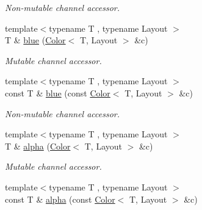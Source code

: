\begin{DoxyCompactItemize}
\begin{DoxyCompactList}\small\item\em Non-\/mutable channel accessor. \end{DoxyCompactList}\item 
\hypertarget{group___channel_accessors_ga002fae45c069050f774c897a69e18b39}{{\footnotesize template$<$typename T , typename Layout $>$ }\\T \& \hyperlink{group___channel_accessors_ga002fae45c069050f774c897a69e18b39}{blue} (\hyperlink{class_d_o_1_1_color}{Color}$<$ T, Layout $>$ \&c)}\label{group___channel_accessors_ga002fae45c069050f774c897a69e18b39}

\begin{DoxyCompactList}\small\item\em Mutable channel accessor. \end{DoxyCompactList}\item 
\hypertarget{group___channel_accessors_ga7f05f0fe577efb6d905528093fbaab0b}{{\footnotesize template$<$typename T , typename Layout $>$ }\\const T \& \hyperlink{group___channel_accessors_ga7f05f0fe577efb6d905528093fbaab0b}{blue} (const \hyperlink{class_d_o_1_1_color}{Color}$<$ T, Layout $>$ \&c)}\label{group___channel_accessors_ga7f05f0fe577efb6d905528093fbaab0b}

\begin{DoxyCompactList}\small\item\em Non-\/mutable channel accessor. \end{DoxyCompactList}\item 
\hypertarget{group___channel_accessors_gaa131549883a0aae99914ffe78da0dbcb}{{\footnotesize template$<$typename T , typename Layout $>$ }\\T \& \hyperlink{group___channel_accessors_gaa131549883a0aae99914ffe78da0dbcb}{alpha} (\hyperlink{class_d_o_1_1_color}{Color}$<$ T, Layout $>$ \&c)}\label{group___channel_accessors_gaa131549883a0aae99914ffe78da0dbcb}

\begin{DoxyCompactList}\small\item\em Mutable channel accessor. \end{DoxyCompactList}\item 
\hypertarget{group___channel_accessors_gaedb55300f0a4cfb17d4f281e437e1ac3}{{\footnotesize template$<$typename T , typename Layout $>$ }\\const T \& \hyperlink{group___channel_accessors_gaedb55300f0a4cfb17d4f281e437e1ac3}{alpha} (const \hyperlink{class_d_o_1_1_color}{Color}$<$ T, Layout $>$ \&c)}\label{group___channel_accessors_gaedb55300f0a4cfb17d4f281e437e1ac3}


\end{DoxyCompactItemize}
